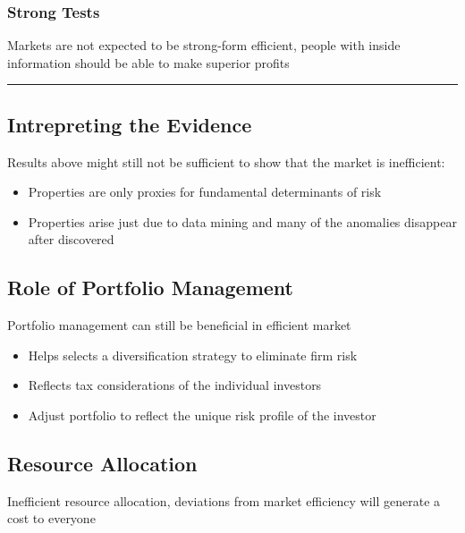 \documentclass[]{book}
\providecommand{\tightlist}{%
  \setlength{\itemsep}{0pt}\setlength{\parskip}{0pt}}
\theoremstyle{definition}
\theoremstyle{definition}
\theoremstyle{remark}
\begin{document}
\subsubsection{Strong Tests}\label{strong-tests}

Markets are not expected to be strong-form efficient, people with inside
information should be able to make superior profits

\begin{center}\rule{0.5\linewidth}{\linethickness}\end{center}

\subsection{Intrepreting the Evidence}\label{intrepreting-the-evidence}

Results above might still not be sufficient to show that the market is
inefficient:

\begin{itemize}
\item
  Properties are only proxies for fundamental determinants of risk
\item
  Properties arise just due to data mining and many of the anomalies
  disappear after discovered
\end{itemize}

\subsection{Role of Portfolio
Management}\label{role-of-portfolio-management}

Portfolio management can still be beneficial in efficient market

\begin{itemize}
\tightlist
\item
  Helps selects a diversification strategy to eliminate firm risk
\item
  Reflects tax considerations of the individual investors
\item
  Adjust portfolio to reflect the unique risk profile of the investor
\end{itemize}

\subsection{Resource Allocation}\label{resource-allocation}

Inefficient resource allocation, deviations from market efficiency will
generate a cost to everyone
\end{document}
